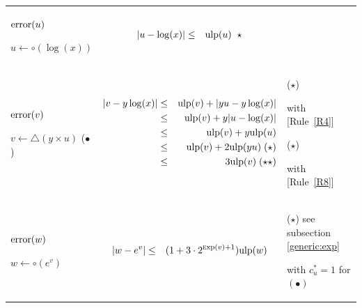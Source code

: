\documentclass[12pt]{amsart}
\def\pinf{\bigtriangleup}
\def\ulp{{\rm ulp}}
\def\Exp{{\rm \textsc exp}}
\newcommand{\U}[1]{\quad \mbox{[Rule~\ref{#1}]}}
\begin{document}
\begin{center}
\begin{tabular}{l l l}

\begin{minipage}{2.5cm}


${\textnormal{error}}(u)$


$u \leftarrow \circ(\log(x))$

\end{minipage} &
\begin{minipage}{7.5cm}

\begin{eqnarray}\nonumber
  |u-\log(x)| &\leq& \ulp(u)\;\;\star
\end{eqnarray}

\end{minipage} &
\begin{minipage}{6cm}

\end{minipage}\\%
\begin{minipage}{2.5cm}
${\textnormal{error}}(v)$


$v \leftarrow \pinf(y \times u) $
($\bullet$)
\end{minipage} &
\begin{minipage}{7.5cm}

\begin{eqnarray}\nonumber
  |v-y\log(x)| &\leq& \ulp(v) + |y u-y \log(x)|\\\nonumber
   &\leq& \ulp(v) + y|u-\log(x)|\\\nonumber
   &\leq& \ulp(v) + y \ulp(u)\\\nonumber
   &\leq& \ulp(v) + 2 \ulp(yu) \;(\star)\\\nonumber
   &\leq& 3 \ulp(v)  \;(\star\star)
\end{eqnarray}


\end{minipage} &
\begin{minipage}{6cm}
($\star$)

with \U{R4}

($\star$)

with \U{R8}

\end{minipage}\\%
\begin{minipage}{2.5cm}
${\textnormal{error}}(w)$


$w \leftarrow \circ(e^v) $

\end{minipage} &
\begin{minipage}{7.5cm}
\begin{eqnarray}\nonumber
  |w-e^v| &\leq& (1+3 \cdot 2^{\Exp(v)+1}) \ulp(w)
\end{eqnarray}
\end{minipage} &
\begin{minipage}{6cm}
($\star$)
see subsection \ref{generic:exp}

with $c_u^* = 1$ for $(\bullet)$
\end{minipage}
\end{tabular}
\end{center}
\end{document}
